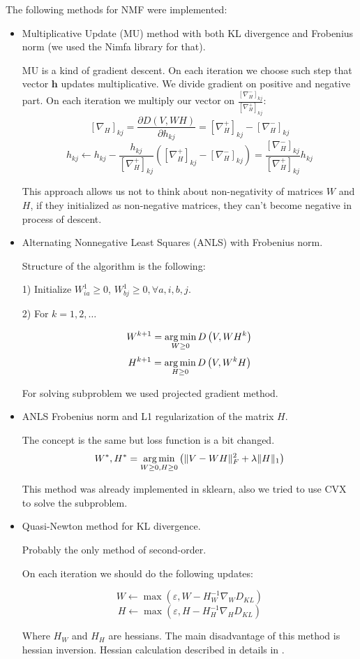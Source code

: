 \documentclass[11pt]{article}
\newcommand{\argmin}{\mathop{\rm arg\,min}\limits} %
\begin{document}
The following methods for NMF were implemented:
\begin{itemize}
\item Multiplicative Update (MU) method with both KL divergence and Frobenius norm (we used the Nimfa library \cite{nimfa} for that).

MU is a kind of gradient descent. On each iteration we choose such step that vector $\mathbf{h}$ updates multiplicative. We divide gradient on positive and negative part. On each iteration we multiply our vector on $\frac{[\nabla_H^-]_{kj}}{[\nabla_H^+]_{kj}}$:
$$[\nabla_H]_{kj}=\frac{\partial D\left(V, WH\right)}{\partial h_{kj}}=[\nabla_H^+]_{kj}-[\nabla_H^-]_{kj}$$
$$h_{kj}\leftarrow h_{kj}-\frac{h_{kj}}{[\nabla_H^+]_{kj}}([\nabla_H^+]_{kj}-[\nabla_H^-]_{kj})=\frac{[\nabla_H^-]_{kj}}{[\nabla_H^+]_{kj}}h_{kj}$$

This approach allows us not to think about non-negativity of matrices $W$ and $H$, if they initialized as non-negative matrices, they can't become negative in process of descent.
\item Alternating Nonnegative Least Squares (ANLS) with Frobenius norm.

Structure of the algorithm is the following:

1) Initialize $W_{ia}^1 \geq 0$, $W_{bj}^1 \geq 0, \forall a,i,b,j$.

2) For $k=1,2,\dots$

$$W^{k+1}=\argmin_{W\geq 0}D\left(V, WH^{k} \right)$$
$$H^{k+1}=\argmin_{H\geq 0}D\left(V, W^{k}H \right)$$

For solving subproblem we used projected gradient method.

\item ANLS Frobenius norm and L1 regularization of the matrix $H$.

The concept is the same but loss function is a bit changed.
$$W^*,H^* = \argmin_{W \geq 0, H \geq 0} \left( \|V- WH\|_F^2 + \lambda\|H\|_1 \right)$$

This method was already implemented in sklearn, also we tried to use CVX to solve the subproblem.
\item Quasi-Newton \cite{zdunek} method for KL divergence.

Probably the only method of second-order.

On each iteration we should do the following updates:

$$W\leftarrow \max(\varepsilon, W-H_W^{-1}\nabla_WD_{KL})$$
$$H\leftarrow \max(\varepsilon, H-H_H^{-1}\nabla_HD_{KL})$$

Where $H_W$ and $H_H$ are hessians. The main disadvantage of this method is hessian inversion. Hessian calculation described in details in \cite{zdunek}.
\end{itemize}
\end{document}
